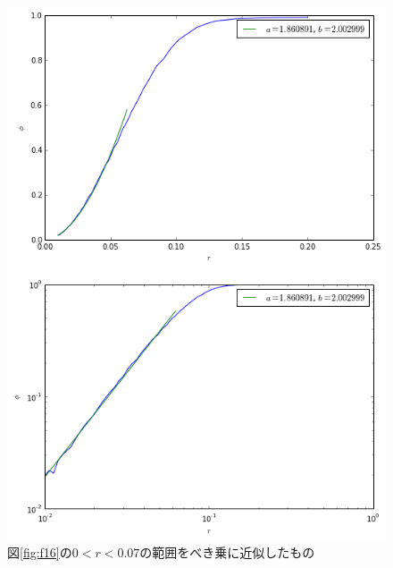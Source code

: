 \begin{figure}[H]
    \begin{center}
        \includegraphics[width=12.5cm]{../img/r_phi_1_power.png}
        \caption{図\ref{fig:f16}の$0<r<0.07$の範囲をべき乗に近似したもの}
        \label{fig:f17}
    \end{center}
\end{figure}

